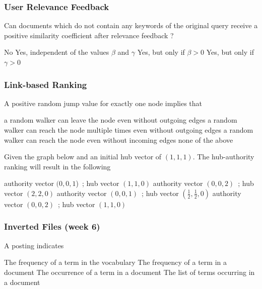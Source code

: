 \documentclass[12pt,a4paper,answers]{exam} %
\begin{document}
\begin{flushleft}
\begin{multicols*}{2}
\begin{questions}
\subsubsection{User Relevance Feedback}
\question Can documents which do not contain any keywords of the original query receive a positive similarity coefficient after relevance feedback ?
\begin{checkboxes}
\choice No
\choice Yes, independent of the values $\beta$ and $\gamma$
\CorrectChoice Yes, but only if $\beta>0$
\choice Yes, but only if $\gamma>0$
\end{checkboxes}


\subsubsection{Link-based Ranking}
\question A positive random jump value for exactly one node implies that
\begin{checkboxes}
\CorrectChoice a random walker can leave the node even without outgoing edges
\choice a random walker can reach the node multiple times even without outgoing edges
\CorrectChoice a random walker can reach the node even without incoming edges
\choice none of the above
\end{checkboxes}

\question Given the graph below and an initial hub vector of $(1,1,1)$. The hub-authority ranking will result in the following
\begin{checkboxes}
\choice authority vector $(0,0,1$)~; hub vector $(1,1,0)$
\choice authority vector $(0,0,2)$~; hub vector $(2,2,0)$
\CorrectChoice authority vector $(0,0,1)$~; hub vector $(\frac{1}{2},\frac{1}{2},0)$
\choice authority vector $(0,0,2)$~; hub vector $(1,1,0)$
\end{checkboxes}


\subsubsection{Inverted Files (week 6)}
\question A posting indicates
\begin{checkboxes}
\choice The frequency of a term in the vocabulary
\choice The frequency of a term in a document
\CorrectChoice The occurrence of a term in a document
\choice The list of terms occurring in a document
\end{checkboxes}


\end{questions}
\end{multicols*}
\end{flushleft}
\end{document}
